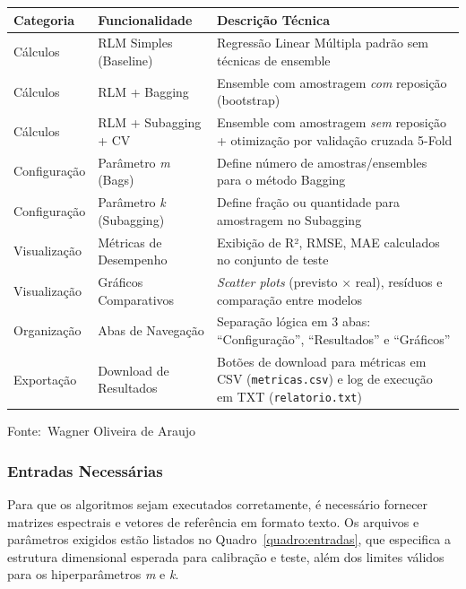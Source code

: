 \documentclass[12pt,a4paper]{article}
\newcommand{\oautor}{Wagner Oliveira de Araujo}
\begin{document}
\begin{quadro}[ht]
\centering
\small
\caption{Inventário das funções do sistema}
\label{quadro:funcoes}
\begin{threeparttable}
\begin{tabularx}{\textwidth}{|l|l|X|} \hline
\textbf{Categoria} & \textbf{Funcionalidade} & \textbf{Descrição Técnica} \\ \hline
Cálculos & RLM Simples (Baseline) & Regressão Linear Múltipla padrão sem técnicas de ensemble \\ \hline
Cálculos & RLM + Bagging & Ensemble com amostragem \textit{com} reposição (bootstrap) \\ \hline
Cálculos & RLM + Subagging + CV & Ensemble com amostragem \textit{sem} reposição + otimização por validação cruzada 5-Fold \\ \hline
Configuração & Parâmetro \textit{m} (Bags) & Define número de amostras/ensembles para o método Bagging \\ \hline
Configuração & Parâmetro \textit{k} (Subagging) & Define fração ou quantidade para amostragem no Subagging \\ \hline
Visualização & Métricas de Desempenho & Exibição de R², RMSE, MAE calculados no conjunto de teste \\ \hline
Visualização & Gráficos Comparativos & \textit{Scatter plots} (previsto $\times$ real), resíduos e comparação entre modelos \\ \hline
Organização & Abas de Navegação & Separação lógica em 3 abas: ``Configuração'', ``Resultados'' e ``Gráficos'' \\ \hline
Exportação & Download de Resultados & Botões de download para métricas em CSV (\texttt{metricas.csv}) e log de execução em TXT (\texttt{relatorio.txt}) \\ \hline
\end{tabularx}
\begin{tablenotes}[flushleft]
\footnotesize
\item Fonte:~\oautor
\end{tablenotes}
\end{threeparttable}
\end{quadro}

\subsubsection{Entradas Necessárias}

Para que os algoritmos sejam executados corretamente, é necessário fornecer matrizes espectrais e vetores de referência em formato texto. Os arquivos e parâmetros exigidos estão listados no Quadro~\ref{quadro:entradas}, que especifica a estrutura dimensional esperada para calibração e teste, além dos limites válidos para os hiperparâmetros \textit{m} e \textit{k}.
\end{document}
